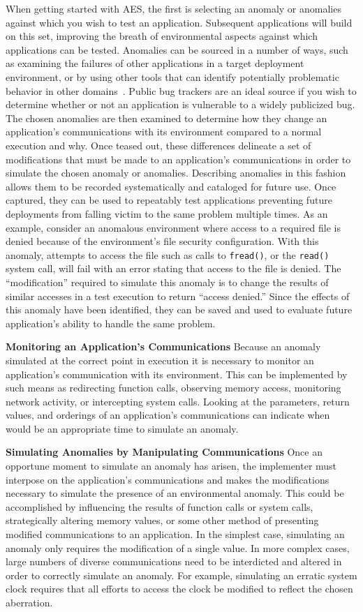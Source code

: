 When getting started with AES, the first
is selecting an anomaly or anomalies
against which you wish to test an application.
Subsequent applications will build on this set,
improving the breath of environmental
aspects against which applications can be tested.
Anomalies can be sourced
in a number of ways,
such as
examining the failures of other applications
in a target deployment environment,
or by using other tools that can identify
potentially problematic behavior in other domains~\cite{Zhuang_NSDI_2014,
rasley2015detecting}.
Public bug trackers are an ideal source
if you wish to determine
whether or not an application
is vulnerable to a widely publicized bug.
The chosen anomalies are then examined
to determine how they change an application's communications
with its environment
compared to a normal execution and why.
Once teased out,
these differences delineate
a set of modifications
that must be made to an application's communications
in order to simulate the chosen anomaly or anomalies.
Describing anomalies in this fashion
allows them to be recorded systematically and cataloged for future use.
Once captured, they can be used to repeatably test applications preventing
future deployments from falling victim to the same problem multiple
times.
As an example,
consider an anomalous environment
where access to a required file is denied because of
the environment's file security configuration.
With this anomaly,
attempts to access the file
such as calls to {\tt fread()},
or the {\tt read()} system call,
will fail with an error stating that access to the file is denied.
The ``modification'' required to simulate this anomaly
is to change the results of similar accesses
in a test execution
to return ``access denied.''
Since the effects of this anomaly have been identified, they can be saved
and used to evaluate future application's ability to handle the same
problem.


\textbf{Monitoring an Application's Communications}
Because an anomaly simulated at the correct point in execution
it is necessary to monitor an application's communication
with its environment.
This can be implemented
by such means as
redirecting function calls,
observing memory access,
monitoring network activity,
or intercepting system calls.
Looking at the parameters,
return values,
and orderings
of an application's communications
can indicate
when would be an appropriate time to simulate an anomaly.


\textbf{Simulating Anomalies by Manipulating Communications}
Once an opportune moment to simulate an anomaly has arisen,
the implementer must
interpose on the application's communications
and makes the modifications necessary
to simulate the presence
of an environmental anomaly.
This could be accomplished by
influencing the results of function calls or system calls,
strategically altering memory values,
or some other method
of presenting modified communications to an application.
In the simplest case,
simulating an anomaly only requires
the modification of a single value.
In more complex cases,
large numbers of diverse communications
need to be interdicted and altered
in order to correctly simulate an anomaly.
For example,
simulating an erratic system clock
requires that all efforts
to access the clock
be modified to reflect the chosen aberration.

